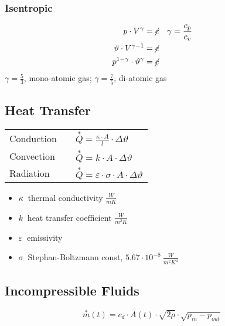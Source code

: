     \subsubsection{Isentropic}
        \vspace{-1em}
        \begin{align*}
            p \cdot V^\gamma &= \cancel{c} && \gamma = \frac{c_p}{c_v}\\
            \vartheta \cdot V^{\gamma - 1} &= \cancel{c}\\
            p^{1-\gamma} \cdot \vartheta^\gamma &= \cancel{c}
        \end{align*}
        $\gamma = \frac{5}{3}$, mono-atomic gas; $\gamma = \frac{7}{5}$, di-atomic gas
\subsection{Heat Transfer}
    \begin{center}
        \begin{tabular}{lp{6pt}l}
            Conduction&&$ \overset{*}{Q} = \frac{\kappa \cdot A}{l} \cdot  \Delta \vartheta $\\
            Convection&&$ \overset{*}{Q} = k \cdot A \cdot  \Delta \vartheta $\\
            Radiation&&$ \overset{*}{Q} = \varepsilon \cdot \sigma \cdot A \cdot  \Delta \vartheta $
        \end{tabular}
    \end{center}
    \begin{itemize}
        \item $\kappa\ $ thermal conductivity $\frac{W}{m K}$
        \item $k\ $ heat transfer coefficient $\frac{W}{m^2 K}$
        \item $\varepsilon\ $ emissivity
        \item $\sigma\ $ Stephan-Boltzmann const, $5.67\cdot10^{-8}~\frac{W}{m^2 K^4}$
    \end{itemize}
\subsection{Incompressible Fluids}
        \vspace{0.5em}
        $$
            \overset{*}{m}(t) = c_d \cdot A(t) \cdot \sqrt{2\rho} \cdot \sqrt{p_{in}-p_{out}}
        $$
